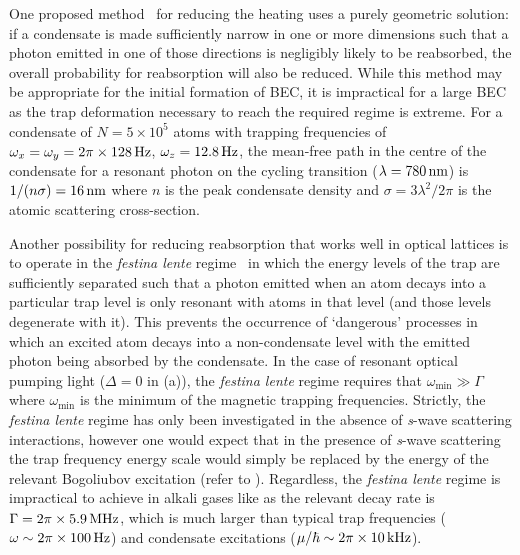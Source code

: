 One proposed method~\citep{Castin:1998,Vengalattore:2003} for reducing the heating uses a purely geometric solution: if a condensate is made sufficiently narrow in one or more dimensions such that a photon emitted in one of those directions is negligibly likely to be reabsorbed, the overall probability for reabsorption will also be reduced.  While this method may be appropriate for the initial formation of BEC, it is impractical for a large BEC as the trap deformation necessary to reach the required regime is extreme.  For a  condensate of $N= 5\times 10^5$ atoms with trapping frequencies of $\omega_x = \omega_y = \unit[2\pi \times 128]{Hz}$, $\omega_z = \unit[12.8]{Hz}$, the mean-free path in the centre of the condensate for a resonant photon on the cycling transition ($\lambda = \unit[780]{nm}$) is $1/(n \sigma) = \unit[16]{nm}$ where $n$ is the peak condensate density and $\sigma = 3 \lambda^2/2 \pi$ is the atomic scattering cross-section.

Another possibility for reducing reabsorption that works well in optical lattices is to operate in the \emph{festina lente} regime~\citep{Wolf:2000,Santos:1999qf,Cirac:1996,Castin:1998} in which the energy levels of the trap are sufficiently separated such that a photon emitted when an atom decays into a particular trap level is only resonant with atoms in that level (and those levels degenerate with it).  This prevents the occurrence of `dangerous' processes in which an excited atom decays into a non-condensate level with the emitted photon being absorbed by the condensate.  In the case of resonant optical pumping light ($\Delta = 0$ in (a)), the \emph{festina lente} regime requires that $\omega_\text{min} \gg \Gamma$  where $\omega_\text{min}$ is the minimum of the magnetic trapping frequencies.  Strictly, the \emph{festina lente} regime has only been investigated in the absence of \emph{s}-wave scattering interactions, however one would expect that in the presence of \emph{s}-wave scattering the trap frequency energy scale would simply be replaced by the energy of the relevant Bogoliubov excitation (refer to ).  Regardless, the \emph{festina lente} regime is impractical to achieve in alkali gases like  as the relevant decay rate is $\Gamma = \unit[2\pi\times 5.9]{MHz}$, which is much larger than typical trap frequencies ($\omega \sim \unit[2\pi \times 100]{Hz}$) and condensate excitations ($\mu/\hbar \sim \unit[2\pi \times 10]{kHz}$).

